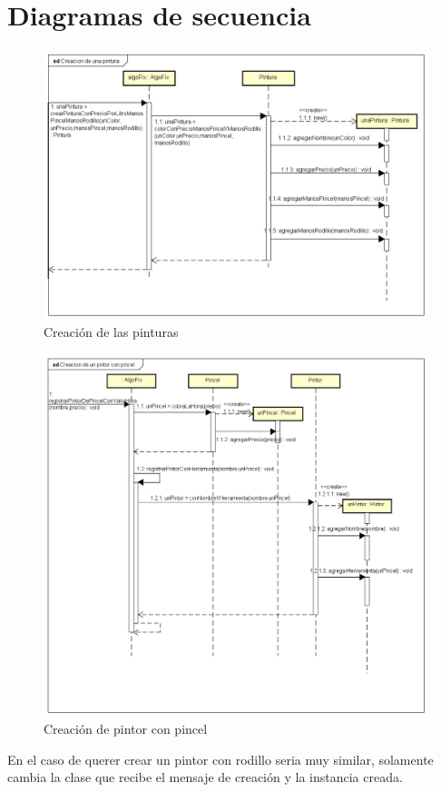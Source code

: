 \documentclass[titlepage,a4paper]{article}
\begin{document}


\section{Diagramas de secuencia}\label{sec:diagramasdesecuencia}

\begin{figure}[H]
\centering
\includegraphics[width=1\textwidth]{Creacion de una pintura.png}
\caption{\label{fig:seq04}Creación de las pinturas}
\end{figure}


\begin{figure}[H]
\centering
\includegraphics[width=1\textwidth]{Creacion de un pintor con pincel.png}
\caption{\label{fig:seq05}Creación de pintor con pincel}
\end{figure}
\indent En el caso de querer crear un pintor con rodillo seria muy similar, solamente cambia la clase que recibe el mensaje de creación y la instancia creada.
\end{document}
